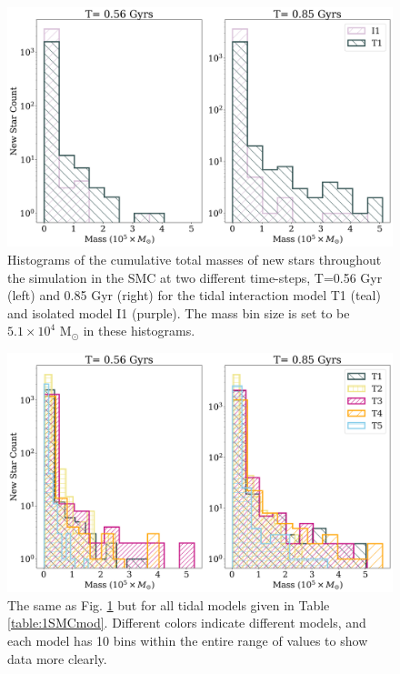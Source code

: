 \documentclass[fleqn,usenatbib]{mnras}
\begin{document}
\begin{figure}
 \includegraphics[width=\columnwidth]{4sexy_density_10_works_bins_m10_11_12_13.png}
 \caption{Histograms of the cumulative total masses of new stars throughout the simulation in the SMC at two different time-steps, T=0.56 Gyr (left) and 0.85 Gyr (right) for the tidal interaction model T1 (teal) and isolated model I1 (purple).
 The mass bin size is set to be $5.1\times10^4$ M$_\odot$ in these histograms.}
 \label{fig:4Histogram}
\end{figure}

\begin{figure}
 \includegraphics[width=\columnwidth]{5._hatched.png}
 \caption{The same as Fig. \ref{fig:4Histogram} but for all tidal models given in Table \ref{table:1SMCmod}. Different colors indicate different models, and each model has 10 bins within the entire range of values to show data more clearly.}
 \label{fig:5Histall}
\end{figure}
\end{document}
